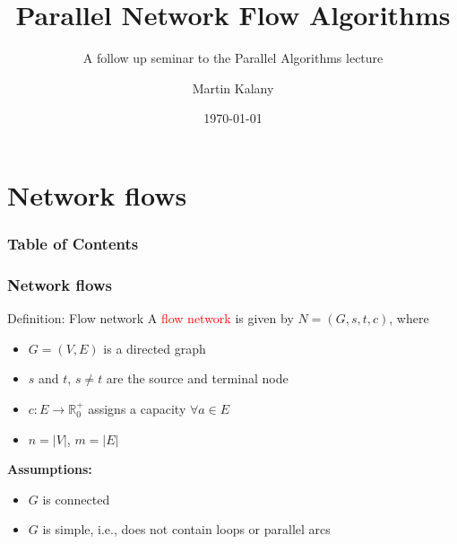 \documentclass{beamer}
\title{Parallel Network Flow Algorithms}
\subtitle{A follow up seminar to the Parallel Algorithms lecture}
\author{Martin Kalany }
\institute
{
  
  Graduate student in Computer Science\\
  Vienna University of Technology\\
}
\date{\today}
\begin{document}

\frame{\titlepage}
\section{Network flows}
\begin{frame}
    \frametitle{Table of Contents}
    \tableofcontents
  \end{frame}
  
\begin{frame}
	\frametitle{Network flows}
    \begin{block}{Definition: Flow network}
    A \textcolor{red}{flow network}   is given by $N = (G,s,t,c)$, where
    \begin{itemize}
    		\item $G =(V,E)$ is a directed graph
    		\item $s$ and $t$, $s \neq t$ are the source and terminal node
    		\item $c:E\rightarrow \mathbb{R}_0^{+}$ assigns a capacity $\forall a \in E$
    		\item $n=\lvert V\rvert$, $m=\lvert E\rvert$
    \end{itemize}
    \end{block}
    \textbf{Assumptions:}
	\begin{itemize}
		\item $G$ is connected
		\item $G$ is simple, i.e., does not contain loops or parallel arcs
	\end{itemize}
\end{frame}
  
\end{document}
